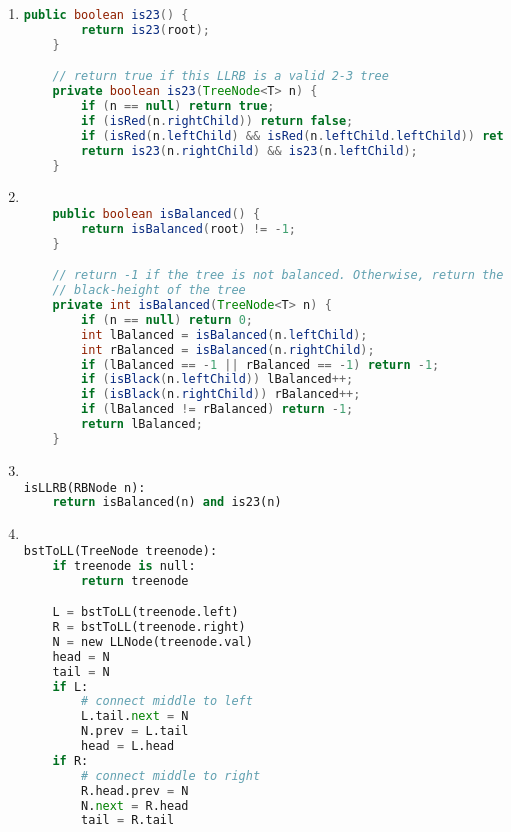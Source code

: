 \documentclass{article}
\begin{document}
\clearpage

\begin{enumerate}
    \item 

\begin{lstlisting}[language=Java]
    public boolean is23() {
        return is23(root);
    }

    // return true if this LLRB is a valid 2-3 tree
    private boolean is23(TreeNode<T> n) {
        if (n == null) return true;
        if (isRed(n.rightChild)) return false;
        if (isRed(n.leftChild) && isRed(n.leftChild.leftChild)) return false;
        return is23(n.rightChild) && is23(n.leftChild);
    }
\end{lstlisting}

\item


\begin{lstlisting}[language=Java]

    public boolean isBalanced() {
        return isBalanced(root) != -1;
    }

    // return -1 if the tree is not balanced. Otherwise, return the
    // black-height of the tree
    private int isBalanced(TreeNode<T> n) {
        if (n == null) return 0;
        int lBalanced = isBalanced(n.leftChild);
        int rBalanced = isBalanced(n.rightChild);
        if (lBalanced == -1 || rBalanced == -1) return -1;
        if (isBlack(n.leftChild)) lBalanced++;
        if (isBlack(n.rightChild)) rBalanced++;
        if (lBalanced != rBalanced) return -1;
        return lBalanced;
    }

\end{lstlisting}

\item


\begin{lstlisting}[language=Python]

isLLRB(RBNode n):
    return isBalanced(n) and is23(n)

\end{lstlisting}

\item


\begin{lstlisting}[language=Python]

bstToLL(TreeNode treenode):
    if treenode is null:
        return treenode

    L = bstToLL(treenode.left)
    R = bstToLL(treenode.right)
    N = new LLNode(treenode.val)
    head = N
    tail = N
    if L:
        # connect middle to left
        L.tail.next = N
        N.prev = L.tail
        head = L.head
    if R:
        # connect middle to right
        R.head.prev = N
        N.next = R.head
        tail = R.tail


\end{lstlisting}
\end{enumerate}
\end{document}
